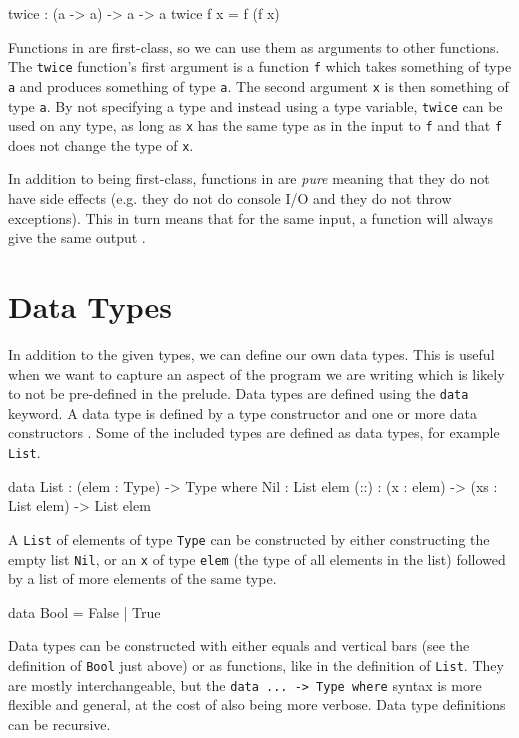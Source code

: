     \begin{code}[caption={A function with a function as an argument}]
        twice : (a -> a) -> a -> a
        twice f x = f (f x)
    \end{code}
    
    Functions in \Idris are first-class, so we can use them as arguments to other functions. The \texttt{twice} function's first argument is a function \texttt{f} which takes something of type \texttt{a} and produces something of type \texttt{a}. The second argument \texttt{x} is then something of type \texttt{a}. By not specifying a type and instead using a type variable, \texttt{twice} can be used on any type, as long as \texttt{x} has the same type as in the input to \texttt{f} and that \texttt{f} does not change the type of \texttt{x}.
    
    In addition to being first-class, functions in \Idris are \textit{pure} meaning that they do not have side effects (e.g. they do not do console I/O and they do not throw exceptions). This in turn means that for the same input, a function will always give the same output \cite{brady_2017}.


\section{Data Types}
    In addition to the given types, we can define our own data types. This is useful when we want to capture an aspect of the program we are writing which is likely to not be pre-defined in the \Idris prelude. Data types are defined using the \texttt{data} keyword. A data type is defined by a type constructor and one or more data constructors \cite{brady_2017}. Some of the included types are defined as data types, for example \texttt{List}.
    
    \begin{code}[caption={\texttt{List} as defined in the \Idris prelude}]
        data List : (elem : Type) -> Type where
            Nil  : List elem
            (::) : (x : elem) -> (xs : List elem) -> List elem 
    \end{code}
    A \texttt{List} of elements of type \texttt{Type} can be constructed by either constructing the empty list \texttt{Nil}, or an \texttt{x} of type \texttt{elem} (the type of all elements in the list) followed by a list of more elements of the same type.
    
    \begin{code}[caption={\texttt{Bool} as defined in the \Idris prelude}]
        data Bool = False
                  | True
    \end{code}
    Data types can be constructed with either equals and vertical bars (see the definition of \texttt{Bool} just above) or as functions, like in the definition of \texttt{List}. They are mostly interchangeable, but the \texttt{data ... -> Type where} syntax is more flexible and general, at the cost of also being more verbose. Data type definitions can be recursive.


